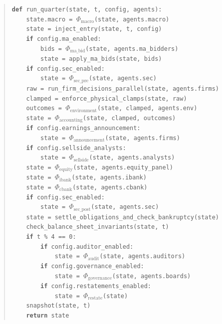 \documentclass[11pt]{article}
\begin{document}
\begin{quote}\small
\texttt{\textbf{def} run\_quarter(state, t, config, agents):}\\
\texttt{~~~~state.macro = $\Phi_\text{macro}$(state, agents.macro)}\\
\texttt{~~~~state = inject\_entry(state, t, config)}\\
\texttt{~~~~\textbf{if} config.ma\_enabled:}\\
\texttt{~~~~~~~~bids = $\Phi_\text{ma\_bid}$(state, agents.ma\_bidders)}\\
\texttt{~~~~~~~~state = apply\_ma\_bids(state, bids)}\\
\texttt{~~~~\textbf{if} config.sec\_enabled:}\\
\texttt{~~~~~~~~state = $\Phi_\text{sec\_pre}$(state, agents.sec)}\\
\texttt{~~~~raw = run\_firm\_decisions\_parallel(state, agents.firms)}\\
\texttt{~~~~clamped = enforce\_physical\_clamps(state, raw)}\\
\texttt{~~~~outcomes = $\Phi_\text{environment}$(state, clamped, agents.env)}\\
\texttt{~~~~state = $\Phi_\text{accounting}$(state, clamped, outcomes)}\\
\texttt{~~~~\textbf{if} config.earnings\_announcement:}\\
\texttt{~~~~~~~~state = $\Phi_\text{announcement}$(state, agents.firms)}\\
\texttt{~~~~\textbf{if} config.sellside\_analysts:}\\
\texttt{~~~~~~~~state = $\Phi_\text{sellside}$(state, agents.analysts)}\\
\texttt{~~~~state = $\Phi_\text{equity}$(state, agents.equity\_panel)}\\
\texttt{~~~~state = $\Phi_\text{ibank}$(state, agents.ibank)}\\
\texttt{~~~~state = $\Phi_\text{cbank}$(state, agents.cbank)}\\
\texttt{~~~~\textbf{if} config.sec\_enabled:}\\
\texttt{~~~~~~~~state = $\Phi_\text{sec\_post}$(state, agents.sec)}\\
\texttt{~~~~state = settle\_obligations\_and\_check\_bankruptcy(state)}\\
\texttt{~~~~check\_balance\_sheet\_invariants(state, t)}\\
\texttt{~~~~\textbf{if} t \% 4 == 0:}\\
\texttt{~~~~~~~~\textbf{if} config.auditor\_enabled:}\\
\texttt{~~~~~~~~~~~~state = $\Phi_\text{audit}$(state, agents.auditors)}\\
\texttt{~~~~~~~~\textbf{if} config.governance\_enabled:}\\
\texttt{~~~~~~~~~~~~state = $\Phi_\text{governance}$(state, agents.boards)}\\
\texttt{~~~~~~~~\textbf{if} config.restatements\_enabled:}\\
\texttt{~~~~~~~~~~~~state = $\Phi_\text{restate}$(state)}\\
\texttt{~~~~snapshot(state, t)}\\
\texttt{~~~~\textbf{return} state}
\end{quote}
\end{document}
